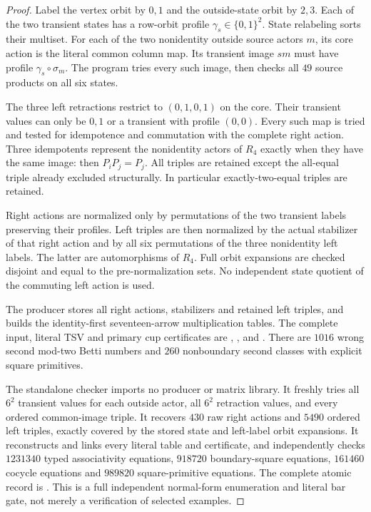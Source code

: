 \begin{proof}
Label the vertex orbit by $0,1$ and the outside-state orbit by
$2,3$.  Each of the two transient states has a row-orbit profile
$\gamma_s\in\{0,1\}^2$.  State relabeling sorts their multiset.
For each of the two nonidentity outside source actors $m$, its
core action is the literal common column map.  Its transient
image $sm$ must have profile $\gamma_s\circ\sigma_m$.
The program tries every such image, then checks all $49$ source
products on all six states.

The three left retractions restrict to $(0,1,0,1)$ on the core.
Their transient values can only be $0,1$ or a transient with
profile $(0,0)$.  Every such map is tried and tested for
idempotence and commutation with the complete right action.
Three idempotents represent the nonidentity actors of $R_4$
exactly when they have the same image: then $P_iP_j=P_j$.
All triples are retained except the all-equal triple already
excluded structurally.  In particular exactly-two-equal triples
are retained.

Right actions are normalized only by permutations of the two
transient labels preserving their profiles.  Left triples are
then normalized by the actual stabilizer of that right action
and by all six permutations of the three nonidentity left labels.
The latter are automorphisms of $R_4$.  Full orbit expansions are
checked disjoint and equal to the pre-normalization sets.  No
independent state quotient of the commuting left action is used.

The producer  stores all
right actions, stabilizers and retained left triples, and builds
the identity-first seventeen-arrow multiplication tables.
The complete input, literal TSV and primary cup certificates are
,
, and
.
There are $1016$ wrong second mod-two Betti numbers and $260$
nonboundary second classes with explicit square primitives.

The standalone checker
 imports no producer
or matrix library.  It freshly tries all $6^2$ transient values
for each outside actor, all $6^2$ retraction values, and every
ordered common-image triple.  It recovers $430$ raw right actions
and $5490$ ordered left triples, exactly covered by the stored
state and left-label orbit expansions.  It reconstructs and
links every literal table and certificate, and independently
checks $1231340$ typed associativity equations, $918720$
boundary-square equations, $161460$ cocycle equations and
$989820$ square-primitive equations.  The complete atomic record is
.
This is a full independent normal-form enumeration and literal
bar gate, not merely a verification of selected examples.
\end{proof}

